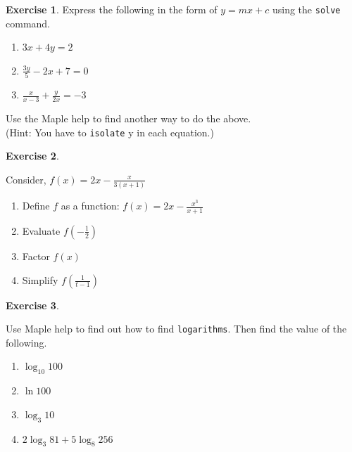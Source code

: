 \documentclass[
]{book}
\providecommand{\tightlist}{%
  \setlength{\itemsep}{0pt}\setlength{\parskip}{0pt}}
\theoremstyle{definition}
\theoremstyle{definition}
\theoremstyle{definition}
\newtheorem{exercise}{Exercise}[chapter]
\theoremstyle{definition}
\theoremstyle{remark}
\begin{document}
\begin{exercise}
\protect\hypertarget{exr:unnamed-chunk-20}{}\label{exr:unnamed-chunk-20}Express the following in the form of \(y =mx +c\) using the \texttt{solve} command.

\begin{enumerate}
\def\labelenumi{\roman{enumi}.}
\tightlist
\item
  \(3x + 4y = 2\)
\item
  \(\frac{3y}{5} - 2x + 7 = 0\)
\item
  \(\frac{x}{x-3} + \frac{y}{2x} = -3\)
\end{enumerate}

Use the Maple help to find another way to do the above.\\
(Hint: You have to \texttt{isolate} y in each equation.)
\end{exercise}

\begin{exercise}
\protect\hypertarget{exr:unnamed-chunk-21}{}\label{exr:unnamed-chunk-21}

Consider, \(f(x) = 2x -\frac{x}{3(x+1)}\)

\begin{enumerate}
\def\labelenumi{\roman{enumi}.}
\tightlist
\item
  Define \(f\) as a function: \(f(x) = 2x - \frac{x^3}{x+1}\)
\item
  Evaluate \(f(-\frac{1}{2})\)
\item
  Factor \(f(x)\)
\item
  Simplify \(f(\frac{1}{t-1})\)
\end{enumerate}

\end{exercise}

\begin{exercise}
\protect\hypertarget{exr:unnamed-chunk-22}{}\label{exr:unnamed-chunk-22}

Use Maple help to find out how to find \texttt{logarithms}. Then find the value of the following.

\begin{enumerate}
\def\labelenumi{\roman{enumi}.}
\tightlist
\item
  \(\log_{10} 100\)
\item
  \(\ln 100\)
\item
  \(\log_3 10\)
\item
  \(2\log_3 81 + 5\log_8 256\)
\end{enumerate}

\end{exercise}
\end{document}
